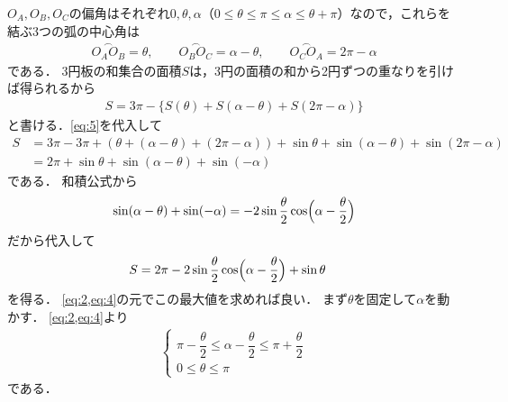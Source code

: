 \documentclass[../../main.tex]{subfiles}
\begin{document}
$O_A,O_B,O_C$の偏角はそれぞれ$0,\theta,\alpha$（$0\le\theta\le\pi\le\alpha\le\theta+\pi$）なので，これらを結ぶ3つの弧の中心角は
\begin{align}
  \overset{\frown}{O_AO_B}=\theta,\qquad\overset{\frown}{O_BO_C}=\alpha-\theta,\qquad\overset{\frown}{O_CO_A}=2\pi-\alpha
\end{align}
である．
3円板の和集合の面積$S$は，3円の面積の和から2円ずつの重なりを引けば得られるから
\begin{align}
  S=3\pi-\bigl\{S(\theta)+S(\alpha-\theta)+S(2\pi-\alpha)\bigr\}
\end{align}
と書ける．\cref{eq:5}を代入して
\begin{align}
  S
  &= 3\pi - 3\pi + \left(\theta+(\alpha-\theta) + (2\pi-\alpha)\right) + \sin\theta + \sin(\alpha-\theta) + \sin(2\pi-\alpha) \\
  &= 2\pi + \sin\theta + \sin(\alpha-\theta) + \sin(-\alpha) \label{eq:6}
\end{align}
である．
和積公式から
\begin{align}
  \sin(\alpha-\theta)+\sin(-\alpha)=-2\sin\dfrac{\theta}{2}\cos\Bigl(\alpha-\dfrac{\theta}{2}\Bigr)
\end{align}
だから代入して
\begin{align}
  S &= 2\pi-2\sin\dfrac{\theta}{2}\cos\Bigl(\alpha-\dfrac{\theta}{2}\Bigr)+\sin\theta \label{eq:7}
\end{align}
を得る．
\cref{eq:2,eq:4}の元でこの最大値を求めれば良い．
まず$\theta$を固定して$\alpha$を動かす．
\cref{eq:2,eq:4}より
\begin{align}
  \begin{cases}
    \pi-\dfrac{\theta}{2} \le \alpha-\dfrac{\theta}{2} \le \pi+\dfrac{\theta}{2} \\
    0\le\theta\le\pi
  \end{cases}
\end{align}
である．
\end{document}
